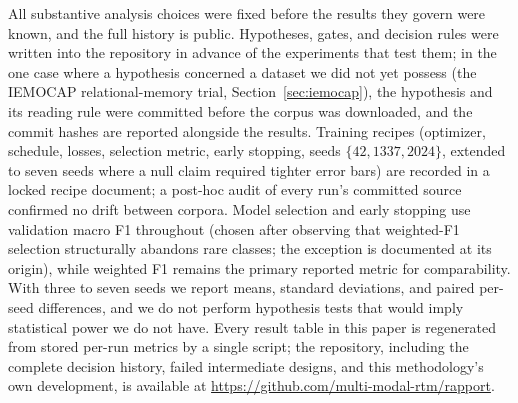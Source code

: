 All substantive analysis choices were fixed before the results they govern were known, and the full history is public. Hypotheses, gates, and decision rules were written into the repository in advance of the experiments that test them; in the one case where a hypothesis concerned a dataset we did not yet possess (the IEMOCAP relational-memory trial, Section~\ref{sec:iemocap}), the hypothesis and its reading rule were committed before the corpus was downloaded, and the commit hashes are reported alongside the results. Training recipes (optimizer, schedule, losses, selection metric, early stopping, seeds $\{42, 1337, 2024\}$, extended to seven seeds where a null claim required tighter error bars) are recorded in a locked recipe document; a post-hoc audit of every run's committed source confirmed no drift between corpora. Model selection and early stopping use validation macro F1 throughout (chosen after observing that weighted-F1 selection structurally abandons rare classes; the exception is documented at its origin), while weighted F1 remains the primary reported metric for comparability. With three to seven seeds we report means, standard deviations, and paired per-seed differences, and we do not perform hypothesis tests that would imply statistical power we do not have. Every result table in this paper is regenerated from stored per-run metrics by a single script; the repository, including the complete decision history, failed intermediate designs, and this methodology's own development, is available at \url{https://github.com/multi-modal-rtm/rapport}.
